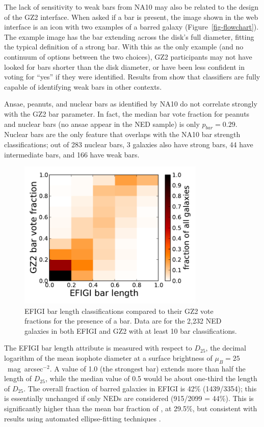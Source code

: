 \documentclass[useAMS,usenatbib]{mn2e}
\begin{document}
The lack of sensitivity to weak bars from NA10 may also be related to the design of the GZ2 interface. When asked if a bar is present, the image shown in the web interface is an icon with two examples of a barred galaxy (Figure~\ref{fig-flowchart}). The example image has the bar extending across the disk's full diameter, fitting the typical definition of a strong bar. With this as the only example (and no continuum of options between the two choices), GZ2 participants may not have looked for bars shorter than the disk diameter, or have been less confident in voting for ``yes'' if they were identified. Results from \citet{hoy11} show that classifiers are fully capable of identifying weak bars in other contexts.

Ansae, peanuts, and nuclear bars as identified by NA10 do not correlate strongly with the GZ2 bar parameter. In fact, the median bar vote fraction for peanuts and nuclear bars (no ansae appear in the NED sample) is only $p_{bar}=0.29$. Nuclear bars are the only feature that overlaps with the NA10 bar strength classifications; out of 283 nuclear bars, 3 galaxies also have strong bars, 44 have intermediate bars, and 166 have weak bars.

\begin{figure}
\includegraphics[angle=0,width=3.5in]{figures/efigi_bars.pdf}
\caption{EFIGI bar length classifications compared to their GZ2 vote fractions for the presence of a bar. Data are for the 2,232 NED galaxies in both EFIGI and GZ2 with at least 10 bar classifications. 
\label{fig-efigi_bars}}
\end{figure}

The EFIGI bar length attribute is measured with respect to $D_{25}$, the decimal logarithm of the mean isophote diameter at a surface brightness of $\mu_B=25$~mag~arcsec$^{-2}$. A value of 1.0 (the strongest bar) extends more than half the length of $D_{25}$, while the median value of 0.5 would be about one-third the length of $D_{25}$. The overall fraction of barred galaxies in EFIGI is 42\% (1439/3354); this is essentially unchanged if only NEDs are considered (915/2099 = 44\%). This is significantly higher than the mean bar fraction of \citet{mas11c}, at 29.5\%, but consistent with results using automated ellipse-fitting techniques \citep{bar08,agu09}. 
\end{document}
